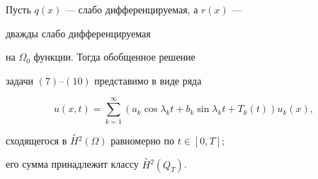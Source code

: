 \begin{thm} 


Пусть $q(x)$ --- слабо дифференцируемая, а $r(x)$ ---


дважды слабо дифференцируемая 


на $\Omega_0$ функции. Тогда обобщенное решение 


задачи $(7)$--$(10)$ представимо в виде ряда 


$$ 


u(x,t)=\sum_{k=1}^{\infty}(a_k \cos{\lambda_{k}t}+ 


b_k\sin{\lambda_{k}t}+T_k (t))u_k (x), 


$$ 


сходящегося в $\overset{\circ}{H}{}^2(\Omega)$ равномерно по $t\in [0,T];$ 


его сумма принадлежит классу $\overset{\circ}{H}{}^2(Q_T)$. 


\end{thm} 


 


